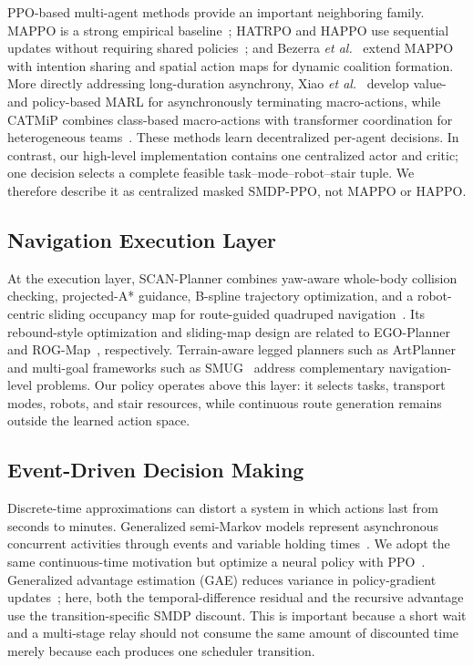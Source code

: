 \documentclass[journal]{IEEEtran}
\begin{document}
PPO-based multi-agent methods provide an important neighboring family. MAPPO is a strong empirical baseline~\cite{yu2022mappo}; HATRPO and HAPPO use sequential updates without requiring shared policies~\cite{kuba2022happo}; and Bezerra \emph{et al.}~\cite{bezerra2025dynamic} extend MAPPO with intention sharing and spatial action maps for dynamic coalition formation. More directly addressing long-duration asynchrony, Xiao \emph{et al.}~\cite{xiao2025asynchronous} develop value- and policy-based MARL for asynchronously terminating macro-actions, while CATMiP combines class-based macro-actions with transformer coordination for heterogeneous teams~\cite{farjadnasab2025catmip}. These methods learn decentralized per-agent decisions. In contrast, our high-level implementation contains one centralized actor and critic; one decision selects a complete feasible task--mode--robot--stair tuple. We therefore describe it as centralized masked SMDP-PPO, not MAPPO or HAPPO.

\subsection{Navigation Execution Layer}

At the execution layer, SCAN-Planner combines yaw-aware whole-body collision checking, projected-A* guidance, B-spline trajectory optimization, and a robot-centric sliding occupancy map for route-guided quadruped navigation~\cite{zheng2026scan}. Its rebound-style optimization and sliding-map design are related to EGO-Planner~\cite{zhou2021egoplanner} and ROG-Map~\cite{ren2024rogmap}, respectively. Terrain-aware legged planners such as ArtPlanner~\cite{wellhausen2023artplanner} and multi-goal frameworks such as SMUG~\cite{chen2023smug} address complementary navigation-level problems. Our policy operates above this layer: it selects tasks, transport modes, robots, and stair resources, while continuous route generation remains outside the learned action space.

\subsection{Event-Driven Decision Making}

Discrete-time approximations can distort a system in which actions last from seconds to minutes. Generalized semi-Markov models represent asynchronous concurrent activities through events and variable holding times~\cite{messias2013gsmdp}. We adopt the same continuous-time motivation but optimize a neural policy with PPO~\cite{schulman2017ppo}. Generalized advantage estimation (GAE) reduces variance in policy-gradient updates~\cite{schulman2016gae}; here, both the temporal-difference residual and the recursive advantage use the transition-specific SMDP discount. This is important because a short wait and a multi-stage relay should not consume the same amount of discounted time merely because each produces one scheduler transition.
\end{document}
